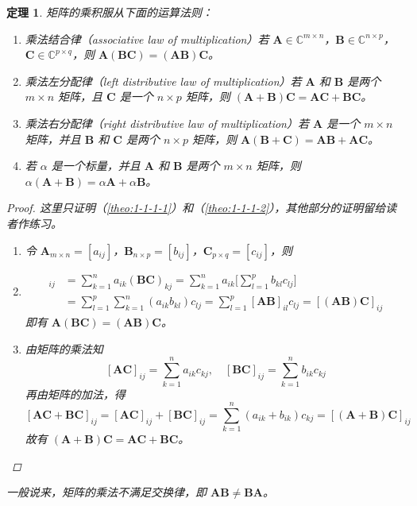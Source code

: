 \documentclass[punct=kaiming, fontset=fandol]{ctexbook}
\numberwithin{equation}{section}
\theoremstyle{mystyle}
\newtheorem{theo}{定理}[section]
\def\bf#1{\symbfit{#1}}
\def\bb#1{\symbb{#1}}
\def\bf#1{\bm{#1}}
\def\bb#1{\mathbb{#1}}
\begin{document}
  \begin{theo}
    矩阵的乘积服从下面的运算法则：
    \begin{enumerate}
      \item \label{theo:1-1-1-1}乘法结合律（associative law of multiplication）若 $\bf A \in \bb C^{m \times n}$，$\bf B \in \bb C^{n \times p}$，$\bf C \in \bb C^{p \times q}$，则 $\bf A(\bf B \bf C) = (\bf A \bf B)\bf C$。
      \item \label{theo:1-1-1-2}乘法左分配律（left distributive law of multiplication）若 $\bf A$ 和 $\bf B$ 是两个 $m \times n$ 矩阵，且 $\bf C$ 是一个 $n \times p$ 矩阵，则 $(\bf A + \bf B) \bf C = \bf A \bf C + \bf B \bf C$。
      \item 乘法右分配律（right distributive law of multiplication）若 $\bf A$ 是一个 $m \times n$ 矩阵，并且 $\bf B$ 和 $\bf C$ 是两个 $n \times p$ 矩阵，则 $\bf A (\bf B + \bf C) = \bf A \bf B + \bf A \bf C$。
      \item 若 $\alpha$ 是一个标量，并且 $\bf A$ 和 $\bf B$ 是两个 $m \times n$ 矩阵，则 $\alpha ( \bf A + \bf B) = \alpha \bf A + \alpha \bf B$。
    \end{enumerate}
    \begin{proof}
      这里只证明（\ref{theo:1-1-1-1}）和（\ref{theo:1-1-1-2}），其他部分的证明留给读者作练习。
      \begin{enumerate}
        \item 令 $\bf A_{m \times n} = [a_{ij}]$，$\bf B_{n \times p} = [b_{ij}]$，$\bf C_{p \times q} = [c_{ij}]$，则
        \item \begin{align*}
          [\bf A (\bf B \bf C)]_{ij}  &= \sum_{k=1}^n a_{ik} (\bf B \bf C)_{kj}           = \sum_{k=1}^n a_{ik} \Biggl[ \sum_{l=1}^p b_{kl} c_{lj} \Biggr]  \\
                                      &= \sum_{l=1}^p \sum_{k=1}^n (a_{ik} b_{kl}) c_{lj} = \sum_{l=1}^p [\bf A \bf B]_{il} c_{lj} = [(\bf A \bf B) \bf C]_{ij}
        \end{align*}
        即有 $\bf A (\bf B \bf C) = (\bf A \bf B) \bf C$。
        \item 由矩阵的乘法知
        \[
          [\bf A \bf C]_{ij} = \sum_{k=1}^n a_{ik} c_{kj}, \quad [\bf B \bf C]_{ij} = \sum_{k=1}^n b_{ik} c_{kj}
        \]
        再由矩阵的加法，得
        \[
          [\bf A \bf C + \bf B \bf C]_{ij} = [\bf A \bf C]_{ij} + [\bf B \bf C]_{ij} = \sum_{k=1}^n (a_{ik} + b_{ik}) c_{kj} = [(\bf A + \bf B) \bf C]_{ij}
        \]
        故有 $(\bf A + \bf B) \bf C = \bf A \bf C + \bf B \bf C$。
      \end{enumerate}
    \end{proof}
    一般说来，矩阵的乘法不满足交换律，即 $\bf A \bf B \ne \bf B \bf A$。
  \end{theo}
  
\end{document}
